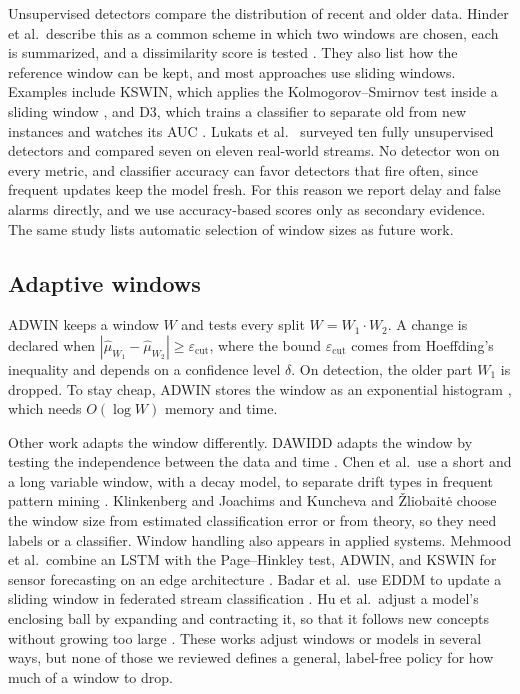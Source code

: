 \documentclass[conference]{IEEEtran}
\begin{document}
Unsupervised detectors compare the distribution of recent and older data. Hinder et al.\ describe this as a common scheme in which two windows are chosen, each is summarized, and a dissimilarity score is tested \cite{hinder2024a}. They also list how the reference window can be kept, and most approaches use sliding windows. Examples include KSWIN, which applies the Kolmogorov--Smirnov test inside a sliding window \cite{raab2020}, and D3, which trains a classifier to separate old from new instances and watches its AUC \cite{gozuacik2019}. Lukats et al.\ \cite{lukats2025} surveyed ten fully unsupervised detectors and compared seven on eleven real-world streams. No detector won on every metric, and classifier accuracy can favor detectors that fire often, since frequent updates keep the model fresh. For this reason we report delay and false alarms directly, and we use accuracy-based scores only as secondary evidence. The same study lists automatic selection of window sizes as future work.

\subsection{Adaptive windows}

ADWIN \cite{bifet2007} keeps a window $W$ and tests every split $W=W_1\cdot W_2$. A change is declared when $|\hat\mu_{W_1}-\hat\mu_{W_2}|\ge\varepsilon_{\mathrm{cut}}$, where the bound $\varepsilon_{\mathrm{cut}}$ comes from Hoeffding's inequality \cite{hoeffding1963} and depends on a confidence level $\delta$. On detection, the older part $W_1$ is dropped. To stay cheap, ADWIN stores the window as an exponential histogram \cite{datar2002}, which needs $O(\log W)$ memory and time.

Other work adapts the window differently. DAWIDD adapts the window by testing the independence between the data and time \cite{hinder2020}. Chen et al.\ use a short and a long variable window, with a decay model, to separate drift types in frequent pattern mining \cite{chen2024}. Klinkenberg and Joachims \cite{klinkenberg2000} and Kuncheva and \v{Z}liobait\.{e} \cite{kuncheva2009} choose the window size from estimated classification error or from theory, so they need labels or a classifier. Window handling also appears in applied systems. Mehmood et al.\ combine an LSTM with the Page--Hinkley test, ADWIN, and KSWIN for sensor forecasting on an edge architecture \cite{mehmood2024}. Badar et al.\ use EDDM to update a sliding window in federated stream classification \cite{badar2023}. Hu et al.\ adjust a model's enclosing ball by expanding and contracting it, so that it follows new concepts without growing too large \cite{hu2024}. These works adjust windows or models in several ways, but none of those we reviewed defines a general, label-free policy for how much of a window to drop.
\end{document}

